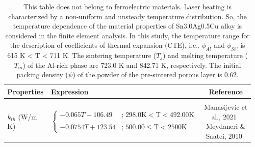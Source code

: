 \documentclass[a4paper,fleqn]{cas-sc}
\begin{document}
\begin{table}
\caption{ This table does not belong to ferroelectric materials. Laser heating is characterized by a non-uniform and unsteady temperature distribution. So, the temperature dependence of the material properties of Sn3.0Ag0.5Cu alloy is considered in the finite element analysis.  In this study, the temperature range for the description of coefficients of thermal expansion (CTE), i.e., $\phi_{Al}$ and $\phi_{Si}$, is 615 K < T < 711 K. The sintering temperature ($T_s$) and melting temperature ($T_m$) of the Al-rich phase are 723.0 K and 842.71 K, respectively.  The initial packing density ($\psi$) of the powder of the pre-sintered porous layer is 0.62.  }\label{table-1}
\begin{tabular*}{\textwidth}{@{\extracolsep{\fill}} llc}
\toprule
\midrule
Properties  & Expression  & Reference  \\
\hline
\\
$k_{th}$ (W/m K)  & $ \begin{cases} 
     -0.065T + 106.49 & \text{; } \mathrm{298.0 K <  T < 492.00 K} \\
    \\
   -0.0754T + 123.54  & \text{; } \mathrm{500.00 \leq T < 2500 K}
    \end{cases}$ &  \makecell[l]{Manasijevic et al., 2021~\cite{MANASIJEVIC2021106685} \\ Meydaneri \& Saatci, 2010~\cite{article_345715}} \\

\end{tabular*}
\end{table}
\end{document}

